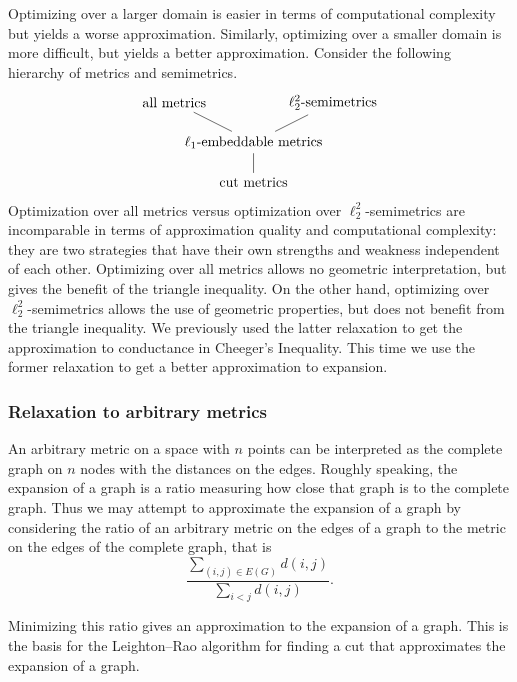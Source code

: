 \documentclass[11pt]{article}
\newcommand{\0}{\mathbf{0}}
\newcommand{\1}{\mathbf{1}}
\begin{document}
Optimizing over a larger domain is easier in terms of computational complexity but yields a worse approximation.
Similarly, optimizing over a smaller domain is more difficult, but yields a better approximation.
Consider the following hierarchy of metrics and semimetrics.
\begin{equation*}
  \begin{tikzpicture}
    \node at (-2, 2) (all) {all metrics};
    \node at (+2, 2) (semi) {$\ell_2^2$-semimetrics};
    \node at (0, 1) (l1) {$\ell_1$-embeddable metrics};
    \node at (0, 0) (cut) {cut metrics};
    \draw (cut) to (l1);
    \draw (l1) to (all);
    \draw (l1) to (semi);
  \end{tikzpicture}
\end{equation*}
Optimization over all metrics versus optimization over $\ell_2^2$-semimetrics are incomparable in terms of approximation quality and computational complexity: they are two strategies that have their own strengths and weakness independent of each other.
Optimizing over all metrics allows no geometric interpretation, but gives the benefit of the triangle inequality.
On the other hand, optimizing over $\ell_2^2$-semimetrics allows the use of geometric properties, but does not benefit from the triangle inequality.
We previously used the latter relaxation to get the approximation to conductance in Cheeger's Inequality.
This time we use the former relaxation to get a better approximation to expansion.

\subsubsection{Relaxation to arbitrary metrics}

An arbitrary metric on a space with $n$ points can be interpreted as the complete graph on $n$ nodes with the distances on the edges.
Roughly speaking, the expansion of a graph is a ratio measuring how close that graph is to the complete graph.
Thus we may attempt to approximate the expansion of a graph by considering the ratio of an arbitrary metric on the edges of a graph to the metric on the edges of the complete graph, that is
\begin{equation*}
  \frac{\sum_{(i, j) \in E(G)} d(i, j)}{\sum_{i < j} d(i, j)}.
\end{equation*}

Minimizing this ratio gives an approximation to the expansion of a graph.
This is the basis for the Leighton--Rao algorithm for finding a cut that approximates the expansion of a graph.
\end{document}
